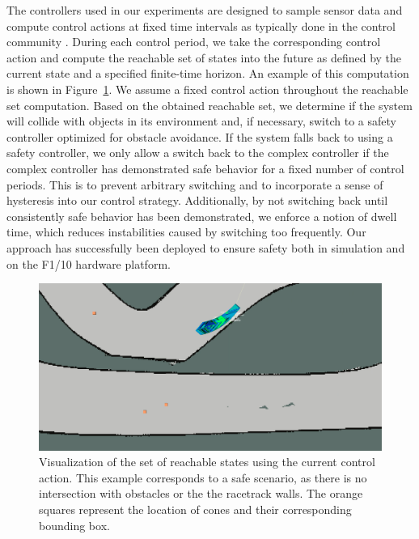 \documentclass[manuscript,screen,review]{acmart}
\begin{document}

The controllers used in our experiments are designed to sample sensor data and compute control actions at fixed time intervals as typically done in the control community \cite{Dai2020}. During each control period, we take the corresponding control action and compute the reachable set of states into the future as defined by the current state and a specified finite-time horizon. An example of this computation is shown in Figure~\ref{fig:reachset}. We assume a fixed control action throughout the reachable set computation. Based on the obtained reachable set, we determine if the system will collide with objects in its environment and, if necessary, switch to a safety controller optimized for obstacle avoidance. If the system falls back to using a safety controller, we only allow a switch back to the complex controller if the complex controller has demonstrated safe behavior for a fixed number of control periods. This is to prevent arbitrary switching and to incorporate a sense of hysteresis into our control strategy. Additionally, by not switching back until consistently safe behavior has been demonstrated, we enforce a notion of dwell time, which reduces instabilities caused by switching too frequently. Our approach has successfully been deployed to ensure safety both in simulation and on the F1/10 hardware platform.

\begin{figure}[htpb]%
  \centering
    \includegraphics[width=0.9\linewidth]{figures/reach_vis_one.png}
   \caption{Visualization of the set of reachable states using the current control action. This example corresponds to a safe scenario, as there is no intersection with obstacles or the the racetrack walls. The orange squares represent the location of cones and their corresponding bounding box.}
  \label{fig:reachset}
\end{figure}
\end{document}
